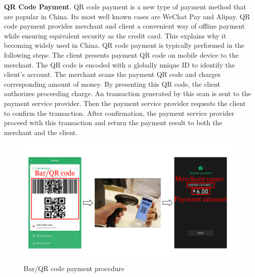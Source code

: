 \textbf{QR Code Payment}.
QR code payment is a new type of payment method that are popular in China. Its most well known cases are WeChat Pay and Alipay. QR code payment provides merchant and client a convenient way of offline payment while ensuring equivalent security as the credit card. This explains why it becoming widely used in China.
QR code payment is typically performed in the following steps:
 The client presents payment QR code on mobile device to the merchant.
The QR code is encoded with a globally unique ID to identify the client's account.
 The merchant scans the payment QR code and charges corresponding amount of money.
By presenting this QR code, the client authorizes proceeding charge.
 An transaction generated by this scan is sent to the payment service provider.
Then the payment service provider requests the client to confirm the transaction.
 After confirmation, the payment service provider proceed with this transaction and return the payment result to both the merchant and the client.

\begin{figure}[t]
	\centering
	\includegraphics[width=\linewidth]{./Figs/qr_code_payment.png}
	\caption{Bar/QR code payment procedure}
	\label{fig:qr_payment_procedure}
\end{figure}


